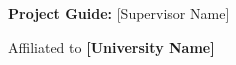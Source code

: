 \begin{titlepage}
\begin{center}
        \vspace{0.8cm}

        {\fontsize{12}{16}\selectfont
        \textbf{Project Guide:} [Supervisor Name]
        }

        \vfill

        {\fontsize{11}{14}\selectfont
        Affiliated to \textbf{[University Name]}
        }

        \vspace{0.3cm}

    \end{center}
\end{titlepage}
